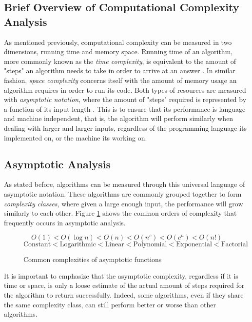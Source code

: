 \documentclass{report}
\begin{document}
\subsection{Brief Overview of Computational Complexity Analysis}
As mentioned previously, computational complexity can be measured in two dimensions, running time and memory space. Running time of an algorithm, more commonly known as the \textit{time complexity}, is equivalent to the amount of "steps" an algorithm needs to take in order to arrive at an answer \autocite{vadhanComputationalComplexity2011}. In similar fashion, \textit{space complexity} concerns itself with the amount of memory usage an algorithm requires in order to run its code. Both types of resources are measured with \textit{asymptotic notation}, where the amount of "steps" required is represented by a function of its input length \autocite{aroraComputationalComplexityModern2016}. This is to ensure that its performance is language and machine independent, that is, the algorithm will perform similarly when dealing with larger and larger inputs, regardless of the programming language its implemented on, or the machine its working on.

\subsection{Asymptotic Analysis}
As stated before, algorithms can be measured through this universal language of asymptotic notation. These algorithms are commonly grouped together to form \textit{complexity classes}, where given a large enough input, the performance will grow similarly to each other. Figure \ref{compFunc} shows the common orders of complexity that frequently occurs in asymptotic analysis.
\begin{figure}[h]
	\centering
	\begin{mdframed}
		\[
		O(1) < O(\log n) < O(n) < O(n^c) < O(c^n) < O(n!)
		\] \[
		\text{Constant} < \text{Logarithmic} < \text{Linear} < \text{Polynomial} < \text{Exponential} < \text{Factorial}
		\]
	\end{mdframed}
	\caption{Common complexities of asymptotic functions}
	\label{compFunc}
\end{figure}

It is important to emphasize that the asymptotic complexity, regardless if it is time or space, is only a loose estimate of the actual amount of steps required for the algorithm to return successfully. Indeed, some algorithms, even if they share the same complexity class, can still perform better or worse than other algorithms.
\end{document}
